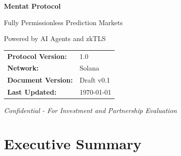 \documentclass[11pt,a4paper]{article}
\begin{document}
\begin{titlepage}
    \centering
    \vspace*{2cm}

    {\Huge\bfseries\color{mentatblue} Mentat Protocol}

    \vspace{0.5cm}
    {\Large Fully Permissionless Prediction Markets}

    \vspace{0.3cm}
    {\large Powered by AI Agents and zkTLS}

    \vspace{2cm}

    \begin{abstract}
        \noindent Mentat Protocol introduces the first fully permissionless prediction market platform that combines AI agents for automated market creation with zero-knowledge Transport Layer Security (zkTLS) for trustless resolution. Unlike existing solutions that rely on governance tokens or centralized oracles, Mentat enables anyone to create prediction markets through natural language prompts while ensuring cryptographically verifiable outcomes. This whitepaper presents the technical architecture, economic model, and market strategy for building prediction markets that are simultaneously fun, trustless, and scalable.
    \end{abstract}

    \vspace{1cm}

    \begin{tabular}{ll}
        \textbf{Protocol Version:} & 1.0 \\
        \textbf{Network:} & Solana \\
        \textbf{Document Version:} & Draft v0.1 \\
        \textbf{Last Updated:} & \today \\
    \end{tabular}

    \vspace{2cm}

    \textit{Confidential - For Investment and Partnership Evaluation}

\end{titlepage}

\tableofcontents
\newpage

\section{Executive Summary}
\end{document}

